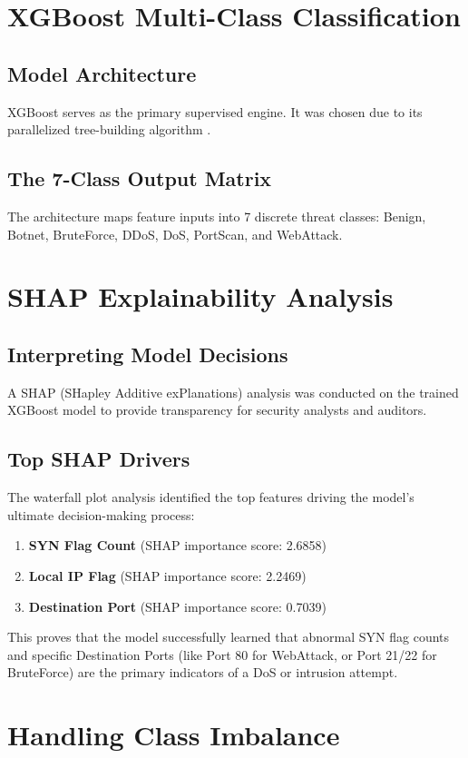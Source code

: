 \documentclass[12pt, a4paper]{report}
\begin{document}
\section{XGBoost Multi-Class Classification}
\subsection{Model Architecture}
XGBoost serves as the primary supervised engine. It was chosen due to its parallelized tree-building algorithm \cite{ref1}.
\subsection{The 7-Class Output Matrix}
The architecture maps feature inputs into 7 discrete threat classes: Benign, Botnet, BruteForce, DDoS, DoS, PortScan, and WebAttack.

\section{SHAP Explainability Analysis}
\subsection{Interpreting Model Decisions}
A SHAP (SHapley Additive exPlanations) analysis was conducted on the trained XGBoost model to provide transparency for security analysts and auditors. 
\subsection{Top SHAP Drivers}
The waterfall plot analysis identified the top features driving the model's ultimate decision-making process:
\begin{enumerate}
    \item \textbf{SYN Flag Count} (SHAP importance score: 2.6858)
    \item \textbf{Local IP Flag} (SHAP importance score: 2.2469)
    \item \textbf{Destination Port} (SHAP importance score: 0.7039)
\end{enumerate}
This proves that the model successfully learned that abnormal SYN flag counts and specific Destination Ports (like Port 80 for WebAttack, or Port 21/22 for BruteForce) are the primary indicators of a DoS or intrusion attempt.

\section{Handling Class Imbalance}
\end{document}
